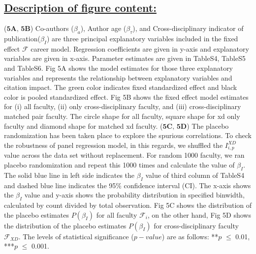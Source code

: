 \documentclass{article}\usepackage[]{graphicx}\usepackage[]{color}
\begin{document}
\subsection*{\underline{Description of figure content:}}
\par{
($\textbf{5A, 5B}$) Co-authors (${{\beta}_a}$), Author age (${{\beta}_{\tau}}$), and Cross-disciplinary indicator of publication(${\beta}_I$) are three principal explanatory variables included in the fixed effect $\mathcal{F}$ career model. Regression coefficients are given in y-axis and explanatory variables are given in x-axis. Parameter estimates are given in TableS4, TableS5 and TableS6. Fig 5A shows the model estimates for those three explanatory variables and represents the relationship between explanatory variables and citation impact. The green color indicates fixed standardized effect and black color is pooled standardized effect. Fig 5B shows the fixed effect model estimates for (i) all faculty, (ii) only cross-disciplinary faculty, and (iii) cross-disciplinary matched pair faculty. The circle shape for all faculty, square shape for xd only faculty and diamond shape for matched xd faculty. ($\textbf{5C, 5D}$) The placebo randomization has been taken place to explore the spurious correlations. To check the robustness of panel regression model, in this regards, we shuffled the ${I}^{XD}_{i,p}$ value across the data set without replacement. For random 1000 faculty, we ran placebo randomization and repeat this 1000 times and calculate the value of ${\beta}_I$. The solid blue line in left side indicates the ${\beta}_I$ value of third column of TableS4 and dashed blue line indicates the 95\% confidence interval (CI). The x-axis shows the ${\beta}_I$ value and y-axis shows the probability distribution in specified binwidth, calculated by count divided by total observation. Fig 5C shows the distribution of the placebo estimates $P({\beta}_I)$ for all faculty $\mathcal{F}_i$, on the other hand, Fig 5D shows the distribution of the placebo estimates $P({\beta}_I)$ for cross-disciplinary faculty $\mathcal{F}_{XD}$. The levels of statistical significance ($p-value$) are as follows: **$\textit{p}$ $\leq$ 0.01, ***$\textit{p}$ $\leq$ 0.001.
}
\end{document}
